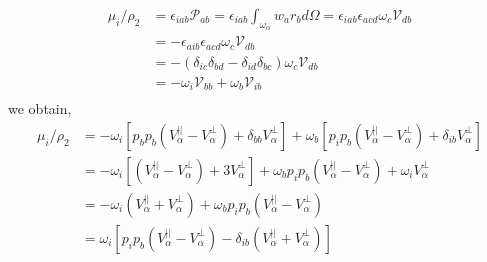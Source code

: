 \begin{align*}
    \mu_i / \rho_2
    &= \epsilon_{iab} \mathcal{P}_{ab}
    = \epsilon_{iab} \int_{\omega_\alpha} w_{a} r_b d\Omega
    = \epsilon_{iab} \epsilon_{acd} \omega_c \mathcal{V}_{db} \\
    &=  -\epsilon_{aib} \epsilon_{acd} \omega_c \mathcal{V}_{db} \\
    &=  -(\delta_{ic}\delta_{bd} - \delta_{id}\delta_{bc}) \omega_c \mathcal{V}_{db} \\
    &=  - \omega_i \mathcal{V}_{bb}  
    + \omega_b \mathcal{V}_{ib} \\
\end{align*}
we obtain, 
\begin{align*}
    \mu_i / \rho_2
    &=  - \omega_i \left[
        p_bp_b (V_\alpha^{||} - V_\alpha^\bot) + \delta_{bb} V_\alpha^\bot
        \right]
    + \omega_b \left[
        p_ip_b (V_\alpha^{||} - V_\alpha^\bot) + \delta_{ib} V_\alpha^\bot
    \right] \\
    &=  - \omega_i \left[
            (V_\alpha^{||} - V_\alpha^\bot) + 3 V_\alpha^\bot
        \right]
    + \omega_b 
        p_ip_b (V_\alpha^{||} - V_\alpha^\bot) 
    + \omega_i V_\alpha^\bot\\
    &=  - \omega_i (
            V_\alpha^{||} + V_\alpha^\bot
        )
    + \omega_b 
        p_ip_b (V_\alpha^{||} - V_\alpha^\bot) \\
    &=  \omega_i \left[
         p_ip_b (V_\alpha^{||} - V_\alpha^\bot) 
        - \delta_{ib} (V_\alpha^{||} + V_\alpha^\bot)
    \right]\\
\end{align*}

